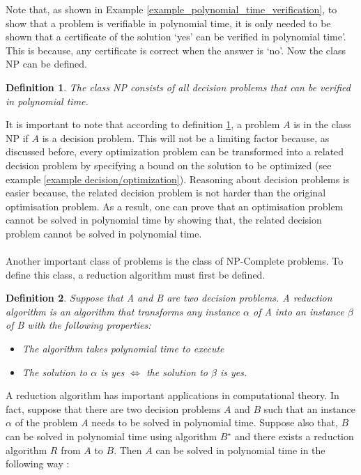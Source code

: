 \documentclass[12pt]{article}
\newtheorem{definition}{Definition}[subsection]
\numberwithin{equation}{subsection}
\numberwithin{table}{subsection}
\begin{document}
Note that, as shown in Example \ref{example_polynomial_time_verification}, to show that a problem is verifiable in polynomial time, it is only needed to be shown that a certificate of the solution `yes' can be verified in polynomial time'. This is because, any certificate is correct when the answer is `no'. Now the class NP can be defined.
\begin{definition}
\label{NP}
The class NP consists of all decision problems that can be verified in polynomial time. {}
\end{definition}
 It is important to note that according to definition \ref{NP}, a problem $\mathit{A}$ is in the class NP if $\mathit{A}$ is a decision problem. This will not be a limiting factor because, as discussed before, every optimization problem can be transformed into a related decision problem by specifying a bound on the solution to be optimized (see example \ref{example decision/optimization}). Reasoning about decision problems is easier because, the related decision problem is not harder than the original optimisation problem. As a result, one can prove that an optimisation problem cannot be solved in polynomial time by showing that, the related decision problem cannot be solved in polynomial time.\cite{cormen_leiserson_rivest_stein}\\\\
Another important class of problems is the class of NP-Complete problems. To define this class, a reduction algorithm must first be defined.
\begin{definition}
\label{reduction_algorithm}
Suppose that A and B are two decision problems. A reduction algorithm is an algorithm that transforms any instance $\alpha$ of A into an instance $\beta$ of B with the following properties:
\begin{itemize}
   \item The algorithm takes polynomial time to execute
   \item The solution to $\alpha$ is yes $\iff$ the solution to $\beta$ is yes. {}
\end{itemize} 
\end{definition}
A reduction algorithm has important applications in computational theory. In fact, suppose that there are two decision problems $\mathit{A}$ and $\mathit{B}$ such that an instance $\mathit{\alpha}$ of the problem $\mathit{A}$ needs to be solved in polynomial time. Suppose also that, $\mathit{B}$ can be solved in polynomial time using algorithm $\mathit{B^\star}$ and there exists a reduction algorithm $\mathit{R}$ from $\mathit{A}$ to $\mathit{B}$. Then $\mathit{A}$ can be solved in polynomial time in the following way :
\end{document}
